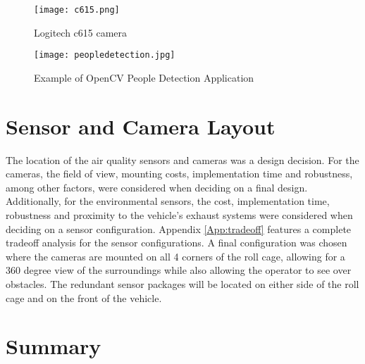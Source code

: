 \begin{figure}[H]
	\centering
	\texttt{[image: c615.png]}
	\caption{Logitech c615 camera}
	\label{fig:logitechcam}
\end{figure}
\begin{figure}[H]
	\centering
	\texttt{[image: peopledetection.jpg]}
	\caption{Example of OpenCV People Detection Application}
	\label{fig:peopledetect}
	\end{figure}

\section{Sensor and Camera Layout}

The location of the air quality sensors and cameras was a design decision. For the cameras, the field of view, mounting costs, implementation time and robustness, among other factors, were considered when deciding on a final design. Additionally, for the environmental sensors, the cost, implementation time, robustness and proximity to the vehicle's exhaust systems were considered when deciding on a sensor configuration. Appendix \ref{App:tradeoff} features a complete tradeoff analysis for the sensor configurations. A final configuration was chosen where the cameras are mounted on all 4 corners of the roll cage, allowing for a 360 degree view of the surroundings while also allowing the operator to see over obstacles. The redundant sensor packages will be located on either side of the roll cage and on the front of the vehicle. 

\section{Summary}